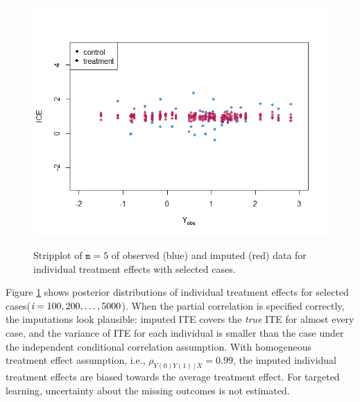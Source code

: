\begin{figure}[ht!]
\begin{center}
{{					\includegraphics[scale=.5]{plots/plot4.8}
				}
			}
		\end{center}
		\caption{Stripplot of $\texttt{m} = 5$ of observed (blue) and imputed (red) data for individual treatment effects with selected cases.}
		\label{fig4_4}
	\end{figure}
	Figure \ref{fig4_4} shows posterior distributions of individual treatment effects for selected cases($\emph{i} = 100, 200, \dots, 5000$). When the partial correlation is specified correctly, the imputations look plausible: imputed ITE covers the \emph{true} ITE for almost every case, and the variance of ITE for each individual is smaller than the case under the independent conditional correlation assumption. With homogeneous treatment effect assumption, i.e., $\rho_{Y(0)Y(1)\,|\ X} = 0.99$, the imputed individual treatment effects are biased towards the average treatment effect. For targeted learning, uncertainty about the missing outcomes is not estimated. 
	
